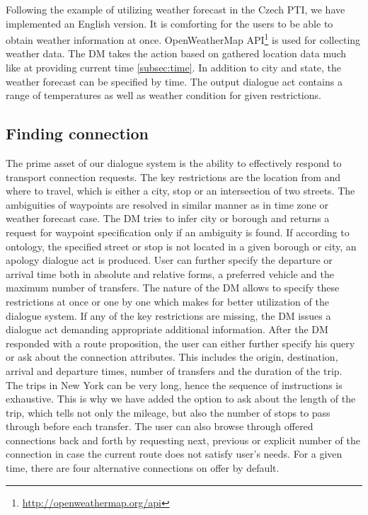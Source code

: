 Following the example of utilizing weather forecast in the Czech PTI, we have implemented an English version.
It is comforting for the users to be able to obtain weather information at once.
OpenWeatherMap API\footnote{\url{http://openweathermap.org/api}} is used for collecting weather data.
The DM takes the action based on gathered location data much like at providing current time \ref{subsec:time}.
In addition to city and state, the weather forecast can be specified by time.
The output dialogue act contains a range of temperatures as well as weather condition for given restrictions.

\subsection{Finding connection}

The prime asset of our dialogue system is the ability to effectively respond to transport connection requests.
The key restrictions are the location from and where to travel, which is either a city, stop or an intersection of two streets.
The ambiguities of waypoints are resolved in similar manner as in time zone or weather forecast case.
The DM tries to infer city or borough and returns a request for waypoint specification only if an ambiguity is found.
If according to ontology, the specified street or stop is not located in a given borough or city, an apology dialogue act is produced.
User can further specify the departure or arrival time both in absolute and relative forms, a preferred vehicle and the maximum number of transfers.
The nature of the DM allows to specify these restrictions at once or one by one which makes for better utilization of the dialogue system.
If any of the key restrictions are missing, the DM issues a dialogue act demanding appropriate additional information.
After the DM responded with a route proposition, the user can either further specify his query or ask about the connection attributes.
This includes the origin, destination, arrival and departure times, number of transfers and the duration of the trip.
The trips in New York can be very long, hence the sequence of instructions is exhaustive.
This is why we have added the option to ask about the length of the trip, which tells not only the mileage, but also the number of stops to pass through before each transfer.
The user can also browse through offered connections back and forth by requesting next, previous or explicit number of the connection in case the current route does not satisfy user's needs.
For a given time, there are four alternative connections on offer by default.

